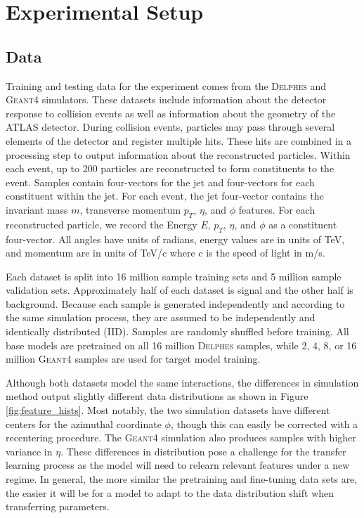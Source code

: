 \chapter{Experimental Setup}

\section{Data}

Training and testing data for the experiment comes from the \textsc{Delphes} and \textsc{Geant4} simulators. These datasets include information about the detector response to collision events as well as information about the geometry of the ATLAS detector. During collision events, particles may pass through several elements of the detector and register multiple hits. These hits are combined in a processing step to output information about the reconstructed particles. Within each event, up to 200 particles are reconstructed to form constituents to the event. Samples contain four-vectors for the jet and four-vectors for each constituent within the jet. For each event, the jet four-vector contains the invariant mass $m$, transverse momentum $p_T$, $\eta$, and $\phi$ features. For each reconstructed particle, we record the Energy $E$, $p_T$, $\eta$, and $\phi$ as a constituent four-vector. All angles have units of radians, energy values are in units of TeV, and momentum are in units of TeV/c where c is the speed of light in m/s.

Each dataset is split into 16 million sample training sets and 5 million sample validation sets. Approximately half of each dataset is signal and the other half is background. Because each sample is generated independently and according to the same simulation process, they are assumed to be independently and identically distributed (IID). Samples are randomly shuffled before training. All base models are pretrained on all 16 million \textsc{Delphes} samples, while 2, 4, 8, or 16 million \textsc{Geant4} samples are used for target model training.

Although both datasets model the same interactions, the differences in simulation method output slightly different data distributions as shown in Figure \ref{fig:feature_hists}. Most notably, the two simulation datasets have different centers for the azimuthal coordinate $\phi$, though this can easily be corrected with a recentering procedure. The \textsc{Geant4} simulation also produces samples with higher variance in $\eta$. These differences in distribution pose a challenge for the transfer learning process as the model will need to relearn relevant features under a new regime. In general, the more similar the pretraining and fine-tuning data sets are, the easier it will be for a model to adapt to the data distribution shift when transferring parameters.

